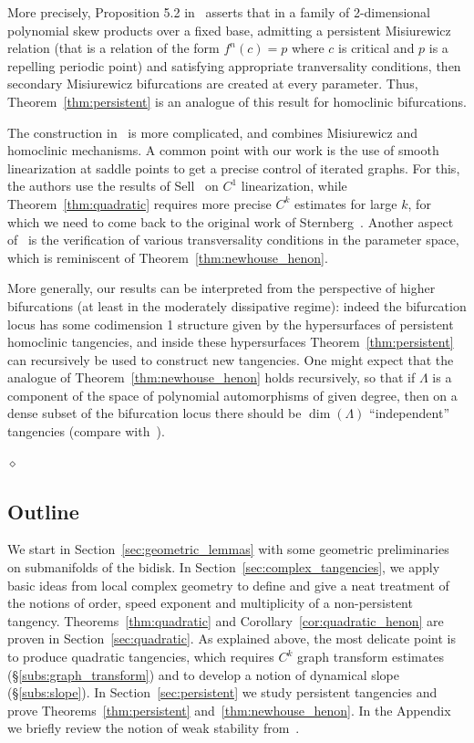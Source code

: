 \documentclass[11pt, oneside]{amsart}
\newcommand{\La}{\Lambda}
\newcommand{\diamant}{\medskip \begin{center}$\diamond$\end{center}\medskip}
\theoremstyle{remark}
\theoremstyle{definition}
\theoremstyle{theorem}
\begin{document}
More precisely, Proposition 5.2 in~\cite{astorg-bianchi} asserts that in a family of 2-dimensional polynomial skew products   over a fixed base, admitting a persistent Misiurewicz relation (that is a relation of the form $f^n(c) = p$ where $c$ is critical and $p$ is a repelling periodic point) and satisfying appropriate  tranversality conditions, then secondary Misiurewicz bifurcations are created at every parameter. Thus, Theorem~\ref{thm:persistent} is an analogue of this result for homoclinic bifurcations.

The construction in~\cite{GTV} is more complicated, and combines Misiurewicz and homoclinic mechanisms. A common point with our work is the use of smooth linearization  at saddle points to get a precise control of iterated graphs. For this, the authors use the results of Sell~\cite{sell} on $C^1$ linearization, while   Theorem~\ref{thm:quadratic}  
 requires more precise $C^k$ estimates for large $k$, for which we need to come back to the original work of Sternberg~\cite{sternberg2}. Another aspect of~\cite{GTV} is the verification of various transversality conditions in the parameter space, which is reminiscent of Theorem~\ref{thm:newhouse_henon}. 
 
More generally,  our results can 
be interpreted from the  perspective of higher bifurcations (at least in the moderately dissipative regime): 
 indeed the bifurcation  locus has some codimension 1 structure given by the hypersurfaces  
 of persistent homoclinic tangencies, and inside these hypersurfaces 
 Theorem~\ref{thm:persistent} 
   can recursively  be used to construct  new tangencies.
 One might expect that the analogue of Theorem~\ref{thm:newhouse_henon} holds 
 recursively, so that if $\La$ is a component of the space of polynomial automorphisms of given degree, 
 then  on a dense subset of the bifurcation locus there should be   $\dim(\La)$ 
 ``independent'' tangencies (compare with~\cite{berger-biebler}). 

\diamant


\subsection*{Outline}  We start in Section~\ref{sec:geometric_lemmas}
with some geometric preliminaries on submanifolds of the bidisk.  In 
Section~\ref{sec:complex_tangencies}, we  apply basic 
 ideas from  local complex geometry 
 to define and give a neat treatment of the notions of 
order, speed exponent and multiplicity of a non-persistent tangency. 
Theorems~\ref{thm:quadratic} 
and Corollary~\ref{cor:quadratic_henon} are proven in Section~\ref{sec:quadratic}. 
As explained above, the most delicate point is to produce quadratic tangencies, which requires 
$C^k$ graph transform estimates (\S\ref{subs:graph_transform}) and to develop a notion of dynamical slope (\S\ref{subs:slope}). 
In Section~\ref{sec:persistent} we study persistent tangencies and prove Theorems~\ref{thm:persistent} 
and~\ref{thm:newhouse_henon}. In the  Appendix we briefly review the notion of weak stability from~\cite{tangencies}. 
  
\end{document}
